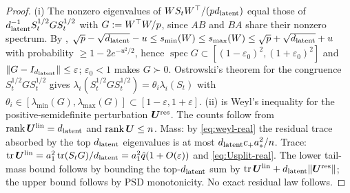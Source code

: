 \begin{proof}
(i) The nonzero eigenvalues of $WS_tW^\top/(pd_{\mathrm{latent}})$ equal those of $d_{\mathrm{latent}}^{-1}S_t^{1/2}GS_t^{1/2}$ with $G:=W^\top W/p$, since $AB$ and $BA$ share their nonzero spectrum. By \citet[Cor.~5.35]{vershynin2010introduction}, $\sqrt{p}-\sqrt{d_{\mathrm{latent}}}-u\le s_{\min}(W)\le s_{\max}(W)\le\sqrt{p}+\sqrt{d_{\mathrm{latent}}}+u$ with probability $\ge1-2e^{-u^2/2}$, hence $\operatorname{spec}G\subset[(1-\varepsilon_0)^2,(1+\varepsilon_0)^2]$ and $\|G-I_{d_{\mathrm{latent}}}\|\le\varepsilon$; $\varepsilon_0<1$ makes $G\succ0$. Ostrowski's theorem for the congruence $S_t^{1/2}GS_t^{1/2}$ gives $\lambda_i(S_t^{1/2}GS_t^{1/2})=\theta_i\lambda_i(S_t)$ with $\theta_i\in[\lambda_{\min}(G),\lambda_{\max}(G)]\subset[1-\varepsilon,1+\varepsilon]$. (ii) is Weyl's inequality for the positive-semidefinite perturbation $\bm{U}^{\mathrm{res}}$. The counts follow from $\operatorname{rank}\bm{U}^{\mathrm{lin}}=d_{\mathrm{latent}}$ and $\operatorname{rank}\bm{U}\le n$. Mass: by \eqref{eq:weyl-real} the residual trace absorbed by the top $d_{\mathrm{latent}}$ eigenvalues is at most $d_{\mathrm{latent}} c_+a_\ast^2/n$. Trace: $\operatorname{tr}\bm{U}^{\mathrm{lin}}=a_1^2\operatorname{tr}(S_tG)/d_{\mathrm{latent}}=a_1^2\hat q(1+O(\varepsilon))$ and \eqref{eq:Usplit-real}. The lower tail-mass bound follows by bounding the top-$d_{\mathrm{latent}}$ sum by $\operatorname{tr}\bm{U}^{\rm lin}+d_{\mathrm{latent}}\|\bm{U}^{\rm res}\|$; the upper bound follows by PSD monotonicity. No exact residual law follows.
\end{proof}


